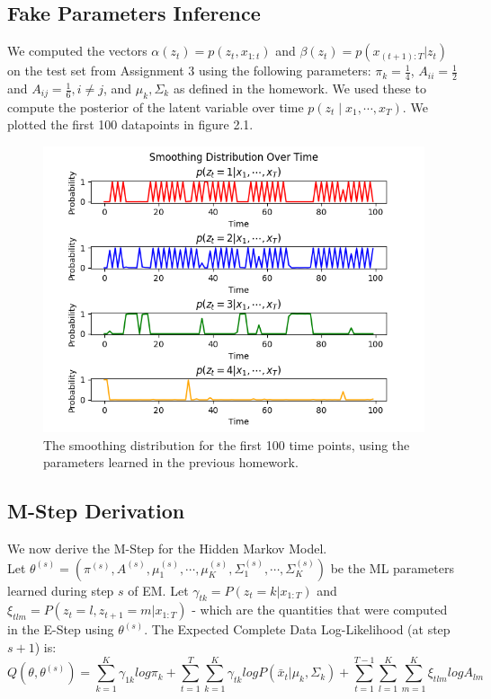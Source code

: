 \documentclass[paper=a4, fontsize=11pt]{scrartcl} %
\numberwithin{equation}{section} %
\numberwithin{figure}{section} %
\numberwithin{table}{section} %
\begin{document}
\subsection{Fake Parameters Inference}
We computed the vectors \(\alpha(z_t)=p(z_t,x_{1:t})\) and \(\beta(z_t)=p(x_{(t+1):T} | z_t)\) on the test set from Assignment 3 using the following parameters: \(\pi_k = \frac{1}{4}\), \(A_{ii}=\frac{1}{2}\) and \(A_{ij}=\frac{1}{6}, i\ne j\), and \(\mu_k, \Sigma_k\) as defined in the homework. 
We used these to compute the posterior of the latent variable over time \(p(z_t \mid x_1, \cdots, x_T)\). We plotted the first 100 datapoints in figure 2.1.

\begin{figure}
	\includegraphics[width=.9\linewidth]{smoothing_dist.png}
	\caption{The smoothing distribution for the first 100 time points, using the parameters learned in the previous homework.}
\end{figure}

\subsection{M-Step Derivation}
We now derive the M-Step for the Hidden Markov Model. \\
Let \(\theta^{(s)} = (\pi^{(s)}, A^{(s)}, \mu_1^{(s)}, \cdots, \mu_K^{(s)}, \Sigma_1^{(s)}, \cdots,\Sigma_K^{(s)})\) be the ML parameters learned during step \(s\) of EM. Let \(\gamma_{tk}=P(z_t=k|x_{1:T})\) and \(\xi_{tlm}=P(z_t=l,z_{t+1}=m|x_{1:T})\) - which are the quantities that were computed in the E-Step using \(\theta^{(s)}\).
The Expected Complete Data Log-Likelihood (at step \(s+1\)) is:
\begin{equation}
Q(\theta, \theta^{(s)}) = \sum_{k=1}^K \gamma_{1k}log\pi_k + \sum_{t=1}^T\sum_{k=1}^K \gamma_{tk}logP(\bar{x}_t|\mu_{k}, \Sigma_{k}) + \sum_{t=1}^{T-1} \sum_{l=1}^K\sum_{m=1}^K\xi_{tlm}logA_{lm}
\end{equation}
\end{document}
